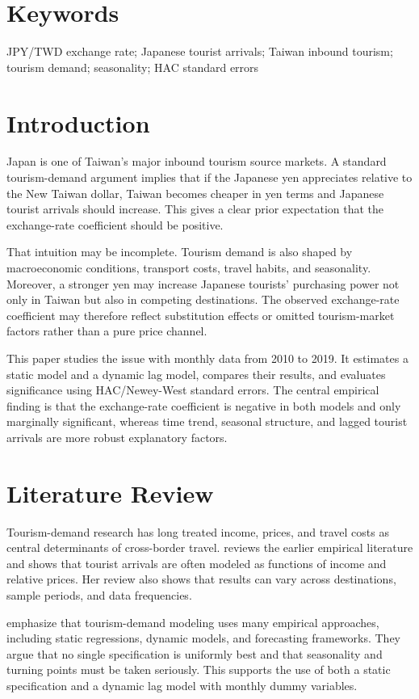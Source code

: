 \documentclass[12pt]{article}
\begin{document}
\section*{Keywords}
JPY/TWD exchange rate; Japanese tourist arrivals; Taiwan inbound tourism; tourism demand; seasonality; HAC standard errors

\section{Introduction}

Japan is one of Taiwan's major inbound tourism source markets. A standard tourism-demand argument implies that if the Japanese yen appreciates relative to the New Taiwan dollar, Taiwan becomes cheaper in yen terms and Japanese tourist arrivals should increase. This gives a clear prior expectation that the exchange-rate coefficient should be positive.

That intuition may be incomplete. Tourism demand is also shaped by macroeconomic conditions, transport costs, travel habits, and seasonality. Moreover, a stronger yen may increase Japanese tourists' purchasing power not only in Taiwan but also in competing destinations. The observed exchange-rate coefficient may therefore reflect substitution effects or omitted tourism-market factors rather than a pure price channel.

This paper studies the issue with monthly data from 2010 to 2019. It estimates a static model and a dynamic lag model, compares their results, and evaluates significance using HAC/Newey-West standard errors. The central empirical finding is that the exchange-rate coefficient is negative in both models and only marginally significant, whereas time trend, seasonal structure, and lagged tourist arrivals are more robust explanatory factors.

\section{Literature Review}

Tourism-demand research has long treated income, prices, and travel costs as central determinants of cross-border travel. \citet{lim1997} reviews the earlier empirical literature and shows that tourist arrivals are often modeled as functions of income and relative prices. Her review also shows that results can vary across destinations, sample periods, and data frequencies.

\citet{songli2008} emphasize that tourism-demand modeling uses many empirical approaches, including static regressions, dynamic models, and forecasting frameworks. They argue that no single specification is uniformly best and that seasonality and turning points must be taken seriously. This supports the use of both a static specification and a dynamic lag model with monthly dummy variables.
\end{document}
